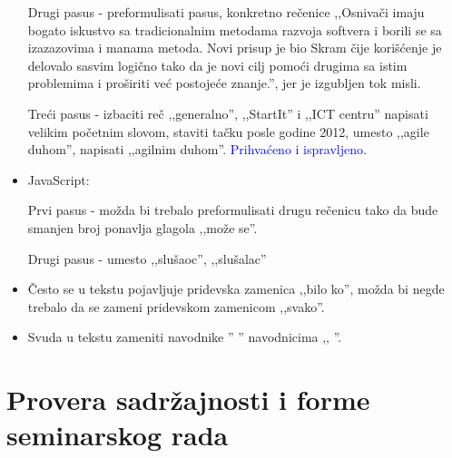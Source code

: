 \documentclass[a4paper]{report}
\newcommand{\odgovor}[1]{\textcolor{blue}{#1}}
\begin{document}
\begin{itemize}
    Drugi pasus -  preformulisati pasus, konkretno rečenice ,,Osnivači imaju bogato iskustvo sa tradicionalnim metodama razvoja softvera i borili se sa izazazovima i manama metoda. Novi prisup je bio Skram čije korišćenje je delovalo sasvim logično tako da je novi cilj pomoći drugima sa istim problemima i proširiti već postojeće znanje.'', jer je izgubljen tok misli.
    
    Treći pasus - izbaciti reč ,,generalno'', ,,StartIt'' i ,,ICT centru'' napisati velikim početnim slovom, staviti tačku posle godine 2012, umesto ,,agile duhom'', napisati ,,agilnim duhom''. 
    \odgovor{Prihvaćeno i ispravljeno.}
    \item JavaScript:
    
    Prvi pasus - možda bi trebalo preformulisati drugu rečenicu tako da bude smanjen broj ponavlja glagola ,,može se''.
    
    Drugi pasus - umesto ,,slušaoc'', ,,slušalac''
    
    \item Često se u tekstu pojavljuje pridevska zamenica ,,bilo ko'',  možda bi negde trebalo da se zameni pridevskom zamenicom ,,svako''.
    
    \item Svuda u tekstu zameniti navodnike '' '' navodnicima ,, ''.
    
   
    
\end{itemize}
\section{Provera sadržajnosti i forme seminarskog rada}
\end{document}
